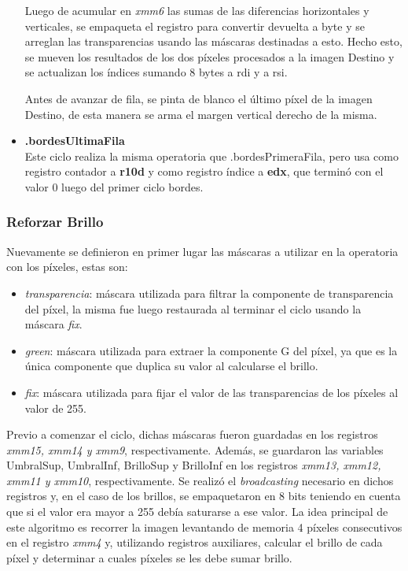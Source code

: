 \documentclass[a4paper]{article}
\begin{document}
\begin{itemize}
	Luego de acumular en \textit{xmm6} las sumas de las diferencias horizontales y verticales, se empaqueta el registro para convertir devuelta a byte y se arreglan las transparencias usando las máscaras destinadas a esto. Hecho esto, se mueven los resultados de los dos píxeles procesados a la imagen Destino y se actualizan los índices sumando 8 bytes a rdi y a rsi.
	
	Antes de avanzar de fila, se pinta de blanco el último píxel de la imagen Destino, de esta manera se arma el margen vertical derecho de la misma.
	\item \textbf{.bordesUltimaFila}\\
	Este ciclo realiza la misma operatoria que .bordesPrimeraFila, pero usa como registro contador a \textbf{r10d} y como registro índice a \textbf{edx}, que terminó con el valor 0 luego del primer ciclo bordes.
\end{itemize}
	
   
\subsubsection{Reforzar Brillo}

\justify
Nuevamente se definieron en primer lugar las máscaras a utilizar en la operatoria con los píxeles, estas son:
\begin{itemize}
	\item \textit{transparencia}: máscara utilizada para filtrar la componente de transparencia del píxel, la misma fue luego restaurada al terminar el ciclo usando la máscara \textit{fix}.
	\item \textit{green}: máscara utilizada para extraer la componente G del píxel, ya que es la única componente que duplica su valor al calcularse el brillo.
	\item \textit{fix}: máscara utilizada para fijar el valor de las transparencias de los píxeles al valor de 255.
\end{itemize} 
\justify
Previo a comenzar el ciclo, dichas máscaras fueron guardadas en los registros \textit{xmm15, xmm14 y xmm9}, respectivamente. Además, se guardaron las variables UmbralSup, UmbralInf, BrilloSup y BrilloInf en los registros \textit{xmm13, xmm12, xmm11 y xmm10}, respectivamente. Se realizó el \textit{broadcasting} necesario en dichos registros y, en el caso de los brillos, se empaquetaron en 8 bits teniendo en cuenta que si el valor era mayor a 255 debía saturarse a ese valor.
\justify
La idea principal de este algoritmo es recorrer la imagen levantando de memoria 4 píxeles consecutivos en el registro \textit{xmm4} y, utilizando registros auxiliares, calcular el brillo de cada píxel y determinar a cuales píxeles se les debe sumar brillo.
\end{document}
